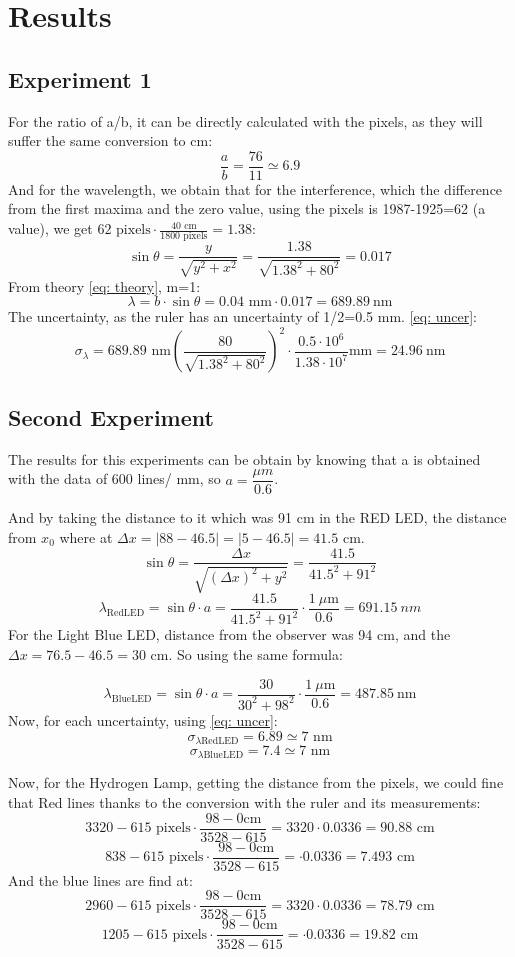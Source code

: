 \section{Results}
\subsection{Experiment 1 }
\vspace*{-4 mm}
For the ratio of a/b, it can be directly calculated with the pixels, as they will suffer the same conversion to cm:
$$\frac{a}{b}=\frac{76}{11}\simeq6.9$$
And for the wavelength, we obtain that for the interference, which the difference from the first maxima and the zero value, using the pixels is 1987-1925=62 (a value), we get $62 \text{ pixels}\cdot \frac{40 \text{ cm}}{1800 \text{ pixels}} = 1.38$:
$$\sin{\theta}= \frac{y}{\sqrt{y^2+x^2}}= \frac{1.38}{\sqrt{1.38^2+80^2}}=0.017$$
From theory \eqref{eq: theory}, m=1:
$$\lambda = b \cdot \sin \theta = 0.04 \text{ mm}  \cdot 0.017 = \boxed{689.89 \ \text{nm}} $$
The uncertainty, as the ruler has an uncertainty of 1/2=0.5 mm. \eqref{eq: uncer}:
$$\sigma_\lambda = 689.89 \text{ nm} \left(\frac{80}{\sqrt{1.38^2+80^2}}\right)^2 \cdot \frac{0.5 \cdot 10^6}{1.38 \cdot 10^{7}} \text{mm} = \boxed{24.96 \ \text{nm}}$$


\subsection{Second Experiment}
The results for this experiments can be obtain by  knowing that a is obtained with the data of 600 lines/ mm, so $a=\dfrac{\mu m}{0.6}$.

And by taking the distance to it which was 91 cm in the RED LED, the distance from $x_0$ where at $\Delta x= |88-46.5| = |5-46.5|=41.5$ cm. 
$$\sin \theta = \frac{\Delta x}{\sqrt{(\Delta x)^2 + y^2}}= \frac{41.5}{41.5^2+91^2}$$
$$\lambda_\text{RedLED} = \sin \theta \cdot a = \frac{41.5}{41.5^2+91^2} \cdot \frac{1 \ \mu \text{m}}{0.6} = \boxed{691.15 \ nm} $$
For the Light Blue LED, distance from the observer was 94 cm, and the $\Delta x = 76.5-46.5= 30$ cm. So using the same formula:

$$\lambda_\text{BlueLED}  = \sin \theta \cdot a = \frac{30}{30^2+98^2} \cdot \frac{1 \ \mu \text{m}}{0.6} = \boxed{487.85 \ \text{nm}} $$
Now, for each uncertainty, using \eqref{eq: uncer}:
$$\sigma_{\lambda\text{RedLED}} =  6.89 \simeq 7 \text{ nm}$$
$$\sigma_{\lambda\text{BlueLED}}  = 7.4 \simeq 7 \text{ nm}$$

Now, for the Hydrogen Lamp, getting the distance from the pixels, we could fine that Red lines thanks to the conversion with the ruler and its measurements:
$$3320-615 \text{ pixels} \cdot  \frac{98 - 0 \text{cm}}{3528-615}= 3320 \cdot 0.0336 =  90.88 \text{ cm}$$
$$838-615 \text{ pixels} \cdot  \frac{98 - 0 \text{cm}}{3528-615}=  \cdot 0.0336 = 7.493 \text{ cm}$$
And the blue lines are find at:
$$2960-615 \text{ pixels} \cdot  \frac{98 - 0 \text{cm}}{3528-615}= 3320 \cdot 0.0336 =  78.79 \text{ cm}$$
$$1205-615 \text{ pixels} \cdot  \frac{98 - 0 \text{cm}}{3528-615}=  \cdot 0.0336 = 19.82 \text{ cm}$$

